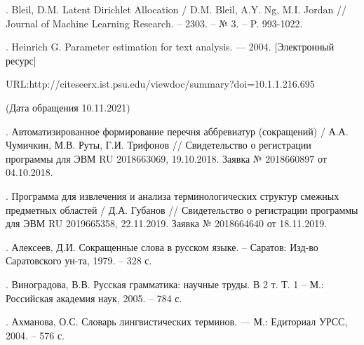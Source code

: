 \documentclass[12pt]{article}
\begin{document}
. Bleil, D.M. Latent Dirichlet Allocation / D.M. Bleil, A.Y. Ng, M.I. Jordan // Journal of Machine Learning Research. – 2303. – № 3. – P. 993-1022.

. Heinrich G. Parameter estimation for text analysis. — 2004. [Электронный ресурс] 

\noindent     URL:http://citeseerx.ist.psu.edu/viewdoc/summary?doi=10.1.1.216.695

\noindent     (Дата обращения 10.11.2021)

. Автоматизированное формирование перечня аббревиатур (сокращений) / А.А. Чумичкин, М.В. Руты, Г.И. Трифонов // Свидетельство о регистрации программы для ЭВМ RU 2018663069, 19.10.2018. Заявка № 2018660897 от 04.10.2018.

. Программа для извлечения и анализа терминологических структур смежных предметных областей / Д.А. Губанов // Свидетельство о регистрации программы для ЭВМ RU 2019665358, 22.11.2019. Заявка № 2018664640 от 18.11.2019.

. Алексеев, Д.И. Сокращенные слова в русском языке. – Саратов: Изд-во Саратовского ун-та, 1979. – 328 с.

. Виноградова, В.В. Русская грамматика: научные труды. В 2 т. Т. 1 – М.: Российская академия наук, 2005. – 784 с.

. Ахманова, О.С. Словарь лингвистических терминов. — М.: Едиториал УРСС, 2004. – 576 с.
    
\end{document}
